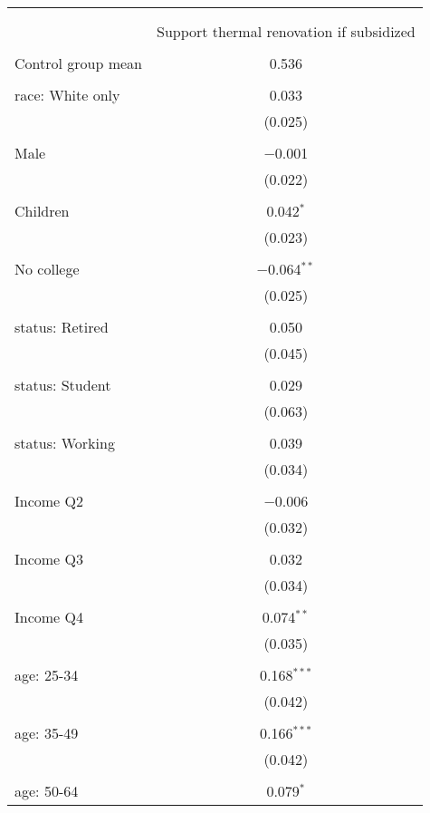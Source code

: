
\begin{tabular}{@{\extracolsep{5pt}}lc} 
\\[-1.8ex]\hline 
\hline \\[-1.8ex] 
\\[-1.8ex] & Support thermal renovation if subsidized \\ 
\hline \\[-1.8ex] 
 Control group mean & 0.536  \\ \hline \\[-1.8ex] race: White only & 0.033 \\ 
  & (0.025) \\ 
  & \\ 
 Male & $-$0.001 \\ 
  & (0.022) \\ 
  & \\ 
 Children & 0.042$^{*}$ \\ 
  & (0.023) \\ 
  & \\ 
 No college & $-$0.064$^{**}$ \\ 
  & (0.025) \\ 
  & \\ 
 status: Retired & 0.050 \\ 
  & (0.045) \\ 
  & \\ 
 status: Student & 0.029 \\ 
  & (0.063) \\ 
  & \\ 
 status: Working & 0.039 \\ 
  & (0.034) \\ 
  & \\ 
 Income Q2 & $-$0.006 \\ 
  & (0.032) \\ 
  & \\ 
 Income Q3 & 0.032 \\ 
  & (0.034) \\ 
  & \\ 
 Income Q4 & 0.074$^{**}$ \\ 
  & (0.035) \\ 
  & \\ 
 age: 25-34 & 0.168$^{***}$ \\ 
  & (0.042) \\ 
  & \\ 
 age: 35-49 & 0.166$^{***}$ \\ 
  & (0.042) \\ 
  & \\ 
 age: 50-64 & 0.079$^{*}$ \\ 

\end{tabular}
